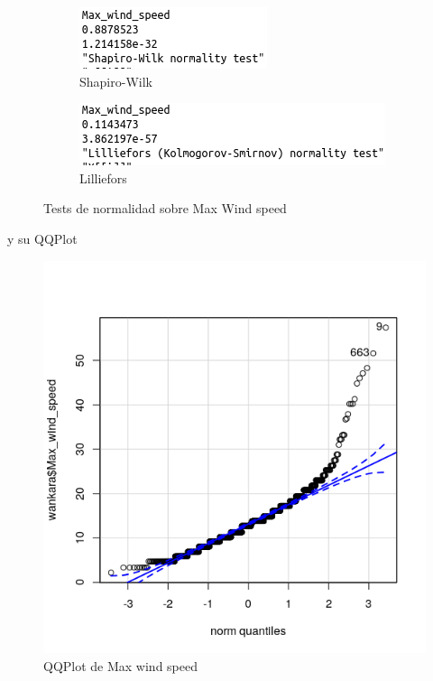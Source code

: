 \begin{figure}[H]
	\centering
	\begin{subfigure}{.5\textwidth}
		\centering
		\includegraphics[width=.7\linewidth]{shapiro-mws.png}
		\caption{Shapiro-Wilk}
		\label{fig:sw-mws}
	\end{subfigure}%
	\begin{subfigure}{.5\textwidth}
		\centering
		\includegraphics[width=.7\linewidth]{lillie-mws.png}	
		\caption{Lilliefors}
		\label{fig:l-mws}
	\end{subfigure}
	\caption{Tests de normalidad sobre Max Wind speed}
	\label{fig:norm-mws}
\end{figure}

y su QQPlot

\begin{figure}[H] %
	\centering
	\includegraphics[scale=0.7]{qq-mws.png}  %
	\caption{QQPlot de Max wind speed} 
	\label{fig:qq-mws}
\end{figure}

